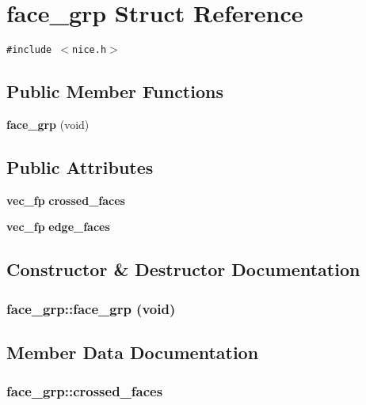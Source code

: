 \section{face\_\-grp Struct Reference}
\label{structface__grp}
{\tt \#include $<$nice.h$>$}

\subsection*{Public Member Functions}
\begin{CompactItemize}
\item 
{\bf face\_\-grp} (void)
\end{CompactItemize}
\subsection*{Public Attributes}
\begin{CompactItemize}
\item 
{\bf vec\_\-fp} {\bf crossed\_\-faces}
\item 
{\bf vec\_\-fp} {\bf edge\_\-faces}
\end{CompactItemize}


\subsection{Constructor \& Destructor Documentation}
\subsubsection{\setlength{\rightskip}{0pt plus 5cm}face\_\-grp::face\_\-grp (void)\hspace{0.3cm}{\tt  [inline]}}\label{structface__grp_c6fb990165cedb5cdff05ae4b712c8d6}




\subsection{Member Data Documentation}
\subsubsection{ {\bf face\_\-grp::crossed\_\-faces}}\label{structface__grp_f27d172a5202ccb227b35dfc80808df9}


